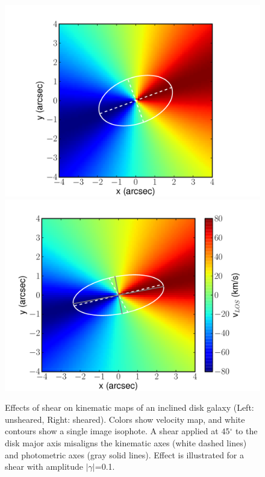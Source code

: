 \documentclass[12pt]{article}
\newcommand{\degr}{\ensuremath{^\circ}}
\begin{document}
\begin{figure}[H]
\begin{center}
\includegraphics[width=0.49\linewidth]{Plots/fig1a.pdf}
\includegraphics[width=0.49\linewidth]{Plots/fig1b.pdf}
\caption{Effects of shear on kinematic maps of an inclined disk galaxy (Left: unsheared, Right: sheared). Colors show velocity map, and white contours show a single image isophote. A shear applied at $45\degr$ to the disk major axis misaligns the kinematic axes (white dashed lines) and photometric axes (gray solid lines). Effect is illustrated for a shear with amplitude $|\gamma|$=0.1.}
\label{fig:vmaps}
\end{center}
\end{figure}
\end{document}
